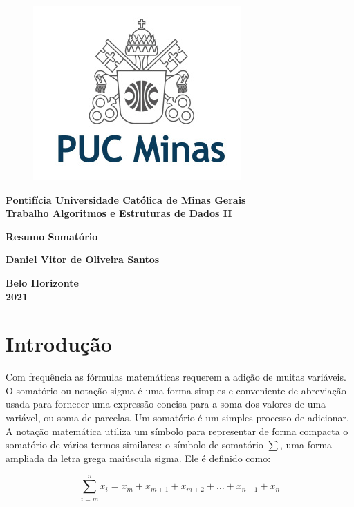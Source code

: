 \documentclass[a4paper, 12pt, fleqn, leqno]{article}
\begin{document}
\thispagestyle{empty}

\begin{figure}[h!b]
\centering \includegraphics[scale=2.5]{logopuc.jpg}
\end{figure}

\begin{center}
{\Large \bf Pontifícia Universidade Católica de Minas Gerais} \\
{\large \bf Trabalho Algoritmos e Estruturas de Dados II}

\vspace{3 cm}

{\Large \bf Resumo Somatório}

\vspace{4.5 cm}

{\Large \bf Daniel Vitor de Oliveira Santos}

\vspace{6.5cm}

{\large \bf Belo Horizonte \\ 2021}

\end{center}
	\section{Introdução}
		Com frequência as fórmulas matemáticas requerem a adição de muitas
variáveis. O somatório ou notação sigma é uma forma simples e 
conveniente de abreviação usada para fornecer uma expressão concisa
para a soma dos valores de uma variável, ou soma de parcelas. Um
somatório é um simples processo de adicionar. A notação matemática utiliza um símbolo para representar de forma compacta o somatório de vários termos similares: o símbolo de somatório $\sum$, uma forma ampliada da letra grega maiúscula sigma. Ele é definido como:
			\begin{flushleft}
				$$ \sum_{i = m}^{n} x_{i} = x_{m} + x_{m+1} + x_{m+2} + \ldots + x_{n - 1} + x_{n}$$
			\end{flushleft}
			
\end{document}
